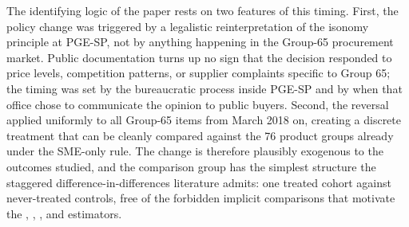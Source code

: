 The identifying logic of the paper rests on two features of this timing. First, the policy change was triggered by a legalistic reinterpretation of the isonomy principle at PGE-SP, not by anything happening in the Group-65 procurement market. Public documentation turns up no sign that the decision responded to price levels, competition patterns, or supplier complaints specific to Group 65; the timing was set by the bureaucratic process inside PGE-SP and by when that office chose to communicate the opinion to public buyers. Second, the reversal applied uniformly to all Group-65 items from March 2018 on, creating a discrete treatment that can be cleanly compared against the 76 product groups already under the SME-only rule. The change is therefore plausibly exogenous to the outcomes studied, and the comparison group has the simplest structure the staggered difference-in-differences literature admits: one treated cohort against never-treated controls, free of the forbidden implicit comparisons that motivate the \citet{goodmanbacon2021}, \citet{sun2021}, \citet{callaway2021}, and \citet{borusyak2024} estimators.
